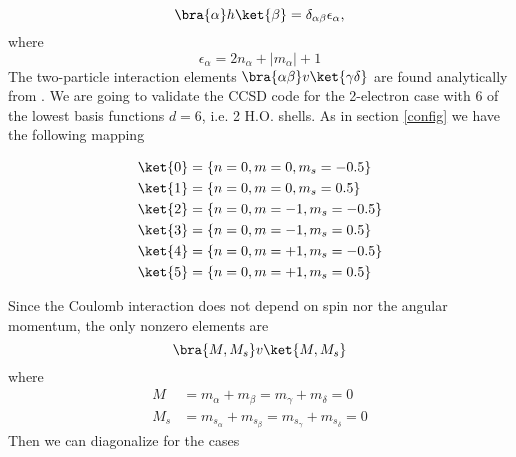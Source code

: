 \begin{equation}
\bra{\alpha}h\ket{\beta} = \delta_{\alpha \beta} \epsilon_\alpha,
  \label{onebodyinteraction}
\end{equation}
%
where
\begin{equation}
\epsilon_\alpha = 2n_\alpha + |m_\alpha| + 1
\end{equation}
%
The two-particle interaction elements $\bra{\alpha\beta}v\ket{\gamma \delta}$ are found analytically from \cite{rontani}. We are going to validate the CCSD code for the 2-electron case with 6 of the lowest basis functions $d=6$, i.e. 2 H.O. shells. As in section \ref{config} we have the following mapping

\begin{align*}
  \ket{0} & = \{n=0, m=0, m_s = -0.5\} \\ 
  \ket{1} & = \{n=0, m=0, m_s = 0.5\} \\
  \ket{2} & = \{n=0, m=-1, m_s = -0.5\} \\
  \ket{3} & = \{n=0, m=-1, m_s = 0.5\} \\
  \ket{4} & = \{n=0, m=+1, m_s = -0.5\} \\
  \ket{5} & = \{n=0, m=+1, m_s = 0.5\}   
\end{align*}
%
\begin{figure}[ht]
\centering
\scalebox{0.7}{}
\end{figure}
%
Since the Coulomb interaction does not depend on spin nor the angular momentum, the only nonzero elements are 
\begin{equation}
\bra{M, M_s} v \ket{M, M_s}
  \label{equation2}
\end{equation}
%
where
%
\begin{align}
  M & = m_\alpha + m_\beta = m_\gamma + m_\delta = 0 \\
  M_s & = m_{s_\alpha} + m_{s_\beta} = m_{s_\gamma} + m_{s_\delta} = 0
 \end{align}
%
Then we can diagonalize for the cases 

